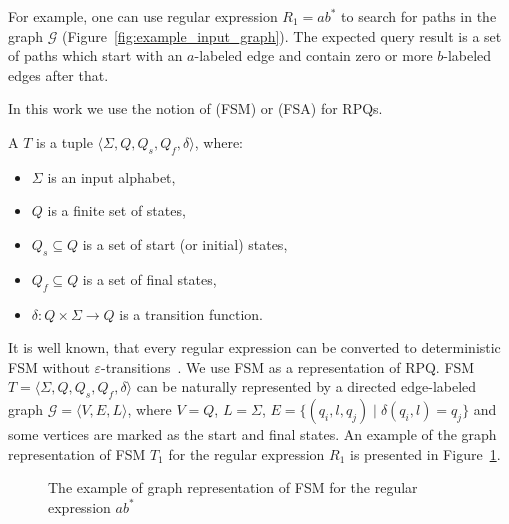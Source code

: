 For example, one can use regular expression $R_1 = ab^*$ to search for paths in the graph $\mathcal{G}$ (Figure~\ref{fig:example_input_graph}).
The expected query result is a set of paths which start with an $a$-labeled edge and contain zero or more $b$-labeled edges after that.

In this work we use the notion of  (FSM) or  (FSA) for RPQs.

\begin{definition}
A  $T$ is a tuple $\langle \Sigma, Q, Q_s, Q_f, \delta \rangle$, where:
\begin{itemize}
    \item $\Sigma$ is an input alphabet,
    \item $Q$ is a finite set of states,
    \item $Q_s \subseteq Q$ is a set of start (or initial) states,
    \item $Q_f \subseteq Q$ is a set of final states,
    \item $\delta: Q \times \Sigma \to Q$ is a transition function.
\end{itemize}
\end{definition}

It is well known, that every regular expression can be converted to deterministic FSM without $\varepsilon$-transitions~\citep{automata:theory:10.5555/1177300}.
We use FSM as a representation of RPQ.
FSM $T = \langle \Sigma, Q, Q_s, Q_f, \delta \rangle$ can be naturally represented by a directed edge-labeled graph $\mathcal{G} = \langle V,E,L \rangle$, where $V = Q$, $L = \Sigma$, $E = \{(q_i,l,q_j) \mid \delta(q_i,l) = q_j\}$ and some vertices are marked as the start and final states.
An example of the graph representation of FSM $T_1$ for the regular expression $R_1$ is presented in Figure~\ref{fig:example_fsm}.

\begin{figure}[h]
    \centering        
    \caption{The example of graph representation of FSM for the regular expression $ab^*$}
    \label{fig:example_fsm}
\end{figure}

